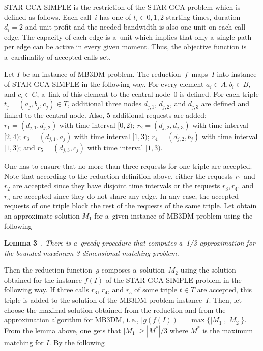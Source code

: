 \begin{multicols}{2}
{STAR-GCA-SIMPLE} is the restriction of the {STAR-GCA}
problem which is defined as follows. Each call~$i$ has one of $t_i
\in {0,1,2}$ starting times, duration $d_i=2$ and unit profit
and the needed bandwidth is also one unit on each call edge. The
capacity of each edge is a~unit which implies that only a~single
path per edge can be active in every given moment. Thus, the
objective function is a~cardinality of accepted calls set.

Let $I$ be an instance of MB3DM problem. The reduction~$f$~maps~$I$
into instance of STAR-GCA-SIMPLE in the following way. For every
element $a_i \in A, b_i \in B$, and $c_i \in C$,  a~link of
this element to the central node~$0$ is defined. For each triple $t_j =
(a_j,b_j,c_j) \in T$, additional three nodes $d_{j,1}$, $d_{j,2}$, and
$d_{j,3}$ are defined and linked to the central node. Also, 5
additional requests are added: $r_1 = (d_{j,1}, d_{j,2})$ with time
interval $[0,2)$; $r_2 = (d_{j,2}, d_{j,3})$ with time interval
$[2,4)$; $r_3 = (d_{j,1}, a_j)$ with time interval $[1,3)$; $r_4 =
(d_{j,2}, b_j)$ with time interval $[1,3)$; and $r_5 = (d_{j,3}, c_j)$
with time interval $[1,3)$.

One has to ensure that no more than three requests for one triple
are accepted. Note that according to the reduction definition above,
either the requests $r_1$ and $r_2$ are accepted since they have
disjoint time intervals or the requests $r_3,r_4$, and $r_5$ are
accepted since they do not share any edge. In any case, the accepted
requests of one triple block the rest of the requests of the same
triple. Let obtain an approximate solution $M_1$ for a~given instance
of MB3DM problem using the following

\smallskip

\noindent
\textbf{Lemma 3}~\cite{AEMSSW2005}. \textit{There is a~greedy
procedure that computes a~1/3-approximation for the bounded maximum
3-dimensional matching problem.}


\smallskip

Then the reduction function~$g$ composes a~solution~$M_2$
using the solution obtained for the instance $f(I)$ of the
STAR-GCA-SIMPLE problem in the following way. If three calls
$r_3$, $r_4$, and $r_5$ of some triple $t \in T$ are accepted, this
triple is added to the solution of the MB3DM problem instance~$I$.
Then, let choose the maximal solution obtained from the reduction and
from the approximation algorithm for MB3DM, i.\,e.,
$|g(f(I))|=\max\{|M_1|,|M_2|\}$. From the lemma above, one gets that
$|M_1| \geq |M^*|/3$ where $M^*$ is the maximum matching for $I$. By
the following


\end{multicols}

